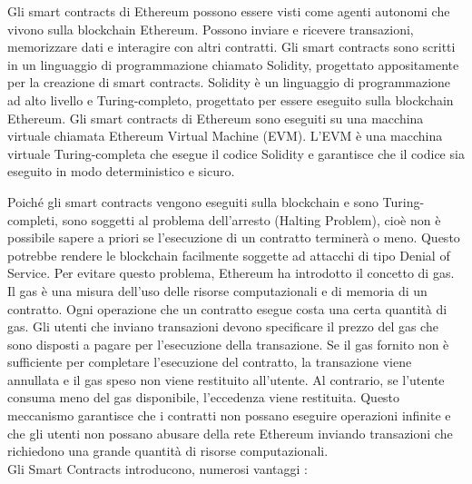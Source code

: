 \documentclass[../../Thesis.tex]{subfiles}
\begin{document}
Gli smart contracts di Ethereum possono essere visti come agenti autonomi che vivono sulla blockchain Ethereum. Possono inviare e ricevere transazioni, memorizzare dati e interagire con altri contratti. Gli smart contracts sono scritti in un linguaggio di programmazione chiamato Solidity, progettato appositamente per la creazione di smart contracts. Solidity è un linguaggio di programmazione ad alto livello e Turing-completo, progettato per essere eseguito sulla blockchain Ethereum. Gli smart contracts di Ethereum sono eseguiti su una macchina virtuale chiamata Ethereum Virtual Machine (EVM). L'EVM è una macchina virtuale Turing-completa che esegue il codice Solidity e garantisce che il codice sia eseguito in modo deterministico e sicuro.

Poiché gli smart contracts vengono eseguiti sulla blockchain e sono Turing-completi, sono soggetti al problema dell'arresto (Halting Problem), cioè non è possibile sapere a priori se l'esecuzione di un contratto terminerà o meno. Questo potrebbe rendere le blockchain facilmente soggette ad attacchi di tipo Denial of Service. Per evitare questo problema, Ethereum ha introdotto il concetto di gas. Il gas è una misura dell'uso delle risorse computazionali e di memoria di un contratto. Ogni operazione che un contratto esegue costa una certa quantità di gas. Gli utenti che inviano transazioni devono specificare il prezzo del gas che sono disposti a pagare per l'esecuzione della transazione. Se il gas fornito non è sufficiente per completare l'esecuzione del contratto, la transazione viene annullata e il gas speso non viene restituito all'utente. Al contrario, se l'utente consuma meno del gas disponibile, l'eccedenza viene restituita. Questo meccanismo garantisce che i contratti non possano eseguire operazioni infinite e che gli utenti non possano abusare della rete Ethereum inviando transazioni che richiedono una grande quantità di risorse computazionali.\\
Gli Smart Contracts introducono, numerosi vantaggi \cite{SCReview}:
\end{document}
